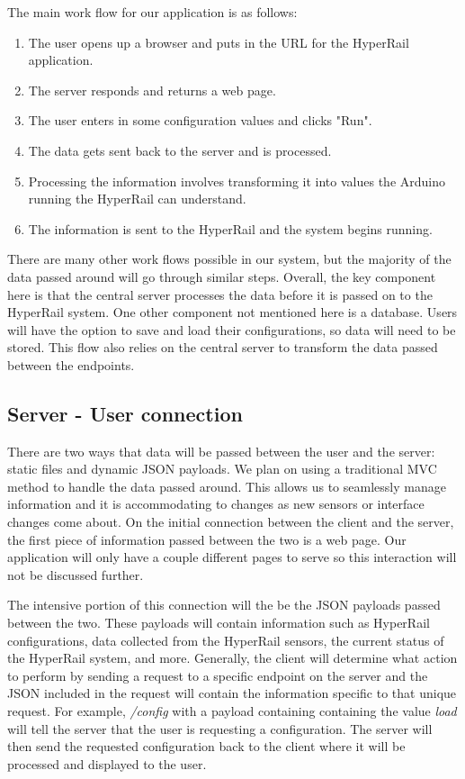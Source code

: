 \documentclass[onecolumn, draftclsnofoot,10pt, compsoc]{IEEEtran}
\begin{document}
    The main work flow for our application is as follows:
    \begin{enumerate}
        \item The user opens up a browser and puts in the URL for the HyperRail application.
        \item The server responds and returns a web page.
        \item The user enters in some configuration values and clicks "Run".
        \item The data gets sent back to the server and is processed.
        \item Processing the information involves transforming it into values the Arduino running the HyperRail can understand.
        \item The information is sent to the HyperRail and the system begins running.
    \end{enumerate}
    There are many other work flows possible in our system, but the majority of the data passed around will go through similar steps. Overall, the key component here is that the central server processes the data before it is passed on to the HyperRail system. One other component not mentioned here is a database. Users will have the option to save and load their configurations, so data will need to be stored. This flow also relies on the central server to transform the data passed between the endpoints.
    
    \subsection{Server - User connection}
    
        There are two ways that data will be passed between the user and the server: static files and dynamic JSON payloads. We plan on using a traditional MVC method to handle the data passed around. This allows us to seamlessly manage information and it is accommodating to changes as new sensors or interface changes come about. On the initial connection between the client and the server, the first piece of information passed between the two is a web page. Our application will only have a couple different pages to serve so this interaction will not be discussed further. 
        
        The intensive portion of this connection will the be the JSON payloads passed between the two. These payloads will contain information such as HyperRail configurations, data collected from the HyperRail sensors, the current status of the HyperRail system, and more. Generally, the client will determine what action to perform by sending a request to a specific endpoint on the server and the JSON included in the request will contain the information specific to that unique request. For example, \textit{/config} with a payload containing containing the value \textit{load} will tell the server that the user is requesting a configuration. The server will then send the requested configuration back to the client where it will be processed and displayed to the user.
        
\end{document}

